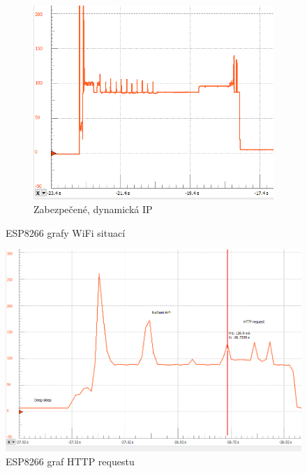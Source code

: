 \documentclass[a4paper, 12pt]{report}
\begin{document}
\begin{figure}[h!]
\begin{subfigure}[b]{0.4\linewidth}
            \includegraphics[width=\linewidth]{images/ESP8266_network_static_security}
            \caption{Zabezpečené, dynamická IP}
        \end{subfigure}
        \caption{ESP8266 grafy WiFi situací}
        \label{fig:esp8266_network}
    \end{figure}

    \begin{figure}[h!]
        \centering
        \includegraphics[width=12cm]{images/ESP8266_http}
        \caption{ESP8266 graf HTTP requestu}
        \label{fig:esp8266_http}
    \end{figure}
\end{document}
